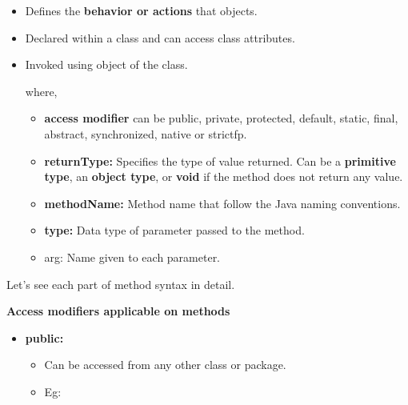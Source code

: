 \setlength{\columnsep}{3pt}
\begin{flushleft}
	
	\begin{itemize}
		\item Defines the \textbf{behavior or actions} that objects.
		\item Declared within a class and can access class attributes.
		\item Invoked using object of the class.
		\bigskip
		
		where,
		\begin{itemize}
			\item \textbf{access modifier} can be public, private, protected, default, static, final, abstract, synchronized, native or strictfp.
			\item \textbf{returnType:} Specifies the type of value returned. Can be a \textbf{primitive type}, an \textbf{object type}, or \textbf{void} if the method does not return any value.
			\item \textbf{methodName:} Method name that follow the Java naming conventions.
			\item \textbf{type:} Data type of parameter passed to the method.
			\item arg: Name given to each parameter.
		\end{itemize}
		
	\end{itemize}

	Let's see each part of method syntax in detail.
	
	\newpage
	
	\textbf{Access modifiers applicable on methods}
	\begin{itemize}
		\item \textbf{public:}
		\begin{itemize}
			\item Can be accessed from any other class or package.
			\item Eg:
			\bigskip
			\bigskip
		\end{itemize}
	

\end{itemize}
\end{flushleft}
